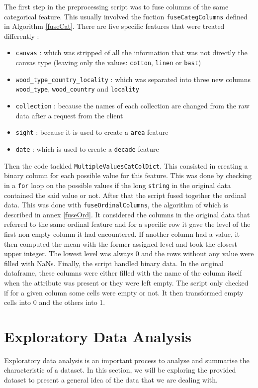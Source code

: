 \documentclass[11pt, oneside]{article}
\begin{document}
\noindent The first step in the preprocessing script was to fuse columns of the same categorical feature. This usually involved the fuction \texttt{fuseCategColumns} defined in Algorithm \ref{fuseCat}. There are five specific features that were treated differently :
\begin{itemize}
\item \texttt{canvas} : which was stripped of all the information that was not directly the canvas type (leaving only the values: \texttt{cotton}, \texttt{linen} or \texttt{bast})
\item \texttt{wood\_type\_country\_locality} :  which was separated into three new columns \texttt{wood\_type}, \texttt{wood\_country} and \texttt{locality}
\item \texttt{collection} :  because the names of each collection are changed from the raw data after a request from the client
\item \texttt{sight} : because it is used to create a \texttt{area} feature
\item \texttt{date} : which is used to create a \texttt{decade} feature
\end{itemize}

\noindent Then the code tackled \texttt{MultipleValuesCatColDict}. This consisted in creating a binary column for each possible value for this feature. This was done by checking in a \texttt{for} loop on the possible values if the long \texttt{string} in the original data contained the said value or not.
\bigbreak
\noindent After that the script fused together the ordinal data. This was done with \texttt{fuseOrdinalColumns}, the algorithm of which is described in annex \ref{fuseOrd}. It considered the columns in the original data that referred to the same ordinal feature and for a specific row it gave the level of the first non empty column it had encountered. If another column had a value, it then computed the mean with the former assigned level and took the closest upper integer. The lowest level was always 0 and the rows without any value were filled with NaNs.
\bigbreak
\noindent Finally, the script handled binary data. In the original dataframe, these columns were either filled with the name of the column itself when the attribute was present or they were left empty. The script only checked if for a given column some cells were empty or not. It then transformed empty cells into 0 and the others into 1.

\newpage
\section{Exploratory Data Analysis}
Exploratory data analysis is an important process to analyse and summarise the characteristic of a dataset. In this section, we will be exploring the provided dataset to present a general idea of the data that we are dealing with.
\end{document}
